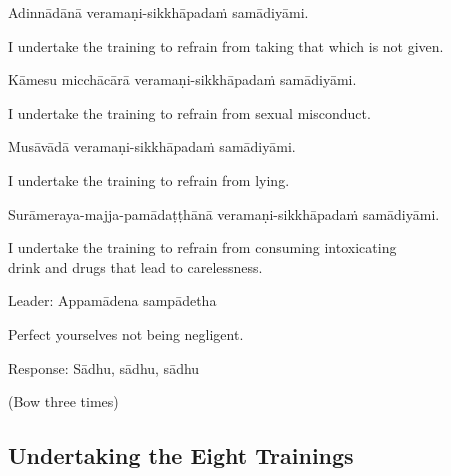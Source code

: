 Adinnādānā veramaṇi-sikkhāpadaṁ samādiyāmi.\\

\begin{english}
  I undertake the training to refrain from taking that which is not given.\\
\end{english}

Kāmesu micchācārā veramaṇi-sikkhāpadaṁ samādiyāmi.\\

\begin{english}
  I undertake the training to refrain from sexual misconduct.\\
\end{english}

Musāvādā veramaṇi-sikkhāpadaṁ samādiyāmi.\\

\begin{english}
  I undertake the training to refrain from lying.\\
\end{english}

Surāmeraya-majja-pamādaṭṭhānā veramaṇi-sikkhāpadaṁ samādiyāmi.\\

\begin{english}
  I undertake the training to refrain from consuming intoxicating\\
  drink and drugs that lead to carelessness.\hyperlink{endnote137-appendix}{\hypertarget{endnote137-body}{}}\\
  \end{english}

Leader: Appamādena sampādetha\\

\begin{english}
  Perfect yourselves not being negligent.\\
\end{english}

Response: Sādhu, sādhu, sādhu\\

\begin{center}
  (Bow three times)\\
\end{center}

\subsection{Undertaking the Eight Trainings}

